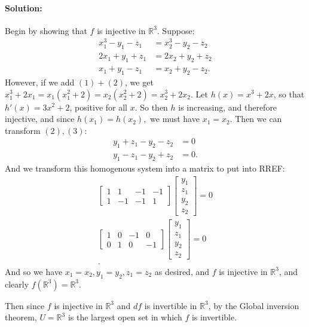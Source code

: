 \documentclass{article}
\begin{document}
\begin{enumerate}
\begin{enumerate}[label= (\alph*)]
        \paragraph{Solution: }Begin by showing that $f$ is injective in $\mathbb{R}^3$. Suppose:
        \begin{align*}
            x_1^3-y_1-z_1&=x_2^3-y_2-z_2\tag{1}\\
            2x_1+y_1+z_1&=2x_2+y_2+z_2\tag{2}\\
            x_1+y_1-z_1&=x_2+y_2-z_2\tag{3}
        .\end{align*}
        However, if we add $(1)+(2)$, we get $x_1^3+2x_1=x_1(x_1^2+2)=x_2(x_2^2+2)=x_2^3+2x_2$.
        Let $h(x)=x^3+2x$, so that $h'(x)=3x^2+2$, positive for all $x$. So then $h$ is increasing, and therefore injective, and since  $h(x_1)=h(x_2),$ we must have $x_1=x_2$. Then we can transform $(2),(3):$ 
         \begin{align*}
            y_1+z_1-y_2-z_2&= 0 \\
            y_1-z_1-y_2+z_2&= 0 
        .\end{align*}
        And we transform this homogenous system into a matrix to put into RREF:
        \begin{align*}
            \begin{bmatrix}1&1&-1&-1\\
                1&-1&-1&1\end{bmatrix}\begin{bmatrix} y_1\\z_1\\y_2\\z_2\end{bmatrix}=0\\
                \begin{bmatrix}1&0&-1&0\\
                0&1&0&-1\end{bmatrix}
                \begin{bmatrix} y_1\\z_1\\y_2\\z_2\end{bmatrix}=0\\
        .\end{align*}
        And so we have $x_1=x_2,y_1=y_2,z_1=z_2$ as desired, and $f$ is injective in $\mathbb{R}^3$, and clearly $f(\mathbb{R}^3)=\mathbb{R}^3$.

        Then since $f$ is injective in $\mathbb{R}^3$ and $df$ is invertible in $\mathbb{R}^3$, by the Global inversion theorem, $U=\mathbb{R}^3$ is the largest open set in which $f$ is invertible.


\end{enumerate}
\end{enumerate}
\end{document}
